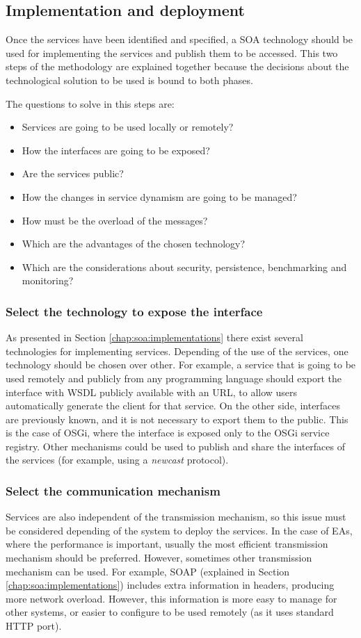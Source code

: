 \subsection{Implementation and deployment}
\label{subsec:soaea:implementation}
Once the services have been identified and specified, a SOA technology should be used for implementing the services and publish them to be accessed. This two steps of the methodology are explained together because the decisions about the technological solution to be used is bound to both phases.

The questions to solve in this steps are:
\begin{itemize}
\item Services are going to be used locally or remotely?
\item How the interfaces are going to be exposed?
\item Are the services public?
\item How the changes in service dynamism are going to be managed?
\item How must be the overload of the messages? %
\item Which are the advantages of the chosen technology?
\item Which are the considerations about security, persistence, benchmarking and monitoring?
\end{itemize} 

\subsubsection{Select the technology to expose the interface}
As presented in Section \ref{chap:soa:implementations} there exist several technologies for implementing services. Depending of the use of the services, one technology should be chosen over other. For example, a service that is going to be used remotely and publicly from any programming language should export the interface with WSDL publicly available with an URL, to allow users automatically generate the client for that service. On the other side, interfaces are previously known, and it is not necessary to export them to the public. This is the case of OSGi, where the interface is exposed only to the OSGi service registry. Other mechanisms could be used to publish and share the interfaces of the services (for example, using a {\em newcast} protocol).

\subsubsection{Select the communication mechanism}
Services are also independent of the transmission mechanism, so this issue must be considered depending of the system to deploy the services. In the case of EAs, where the performance is important, usually the most efficient transmission mechanism should be preferred. However, sometimes other transmission mechanism can be used. For example, SOAP (explained in Section \ref{chap:soa:implementations}) includes extra information in headers, producing more network overload. However, this information is more easy to manage for other systems, or easier to configure to be used remotely (as it uses standard HTTP port).

